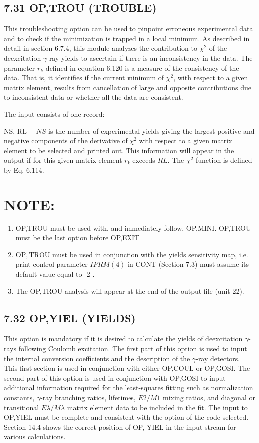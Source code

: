 \documentclass[10pt]{article}
\begin{document}
\subsection*{7.31 OP,TROU (TROUBLE)}
This troubleshooting option can be used to pinpoint erroneous experimental data and to check if the minimization is trapped in a local minimum. As described in detail in section 6.7.4, this module analyzes the contribution to $\chi^{2}$ of the deexcitation $\gamma$-ray yields to ascertain if there is an inconsistency in the data. The parameter $r_{k}$ defined in equation 6.120 is a measure of the consistency of the data. That is, it identifies if the current minimum of $\chi^{2}$, with respect to a given matrix element, results from cancellation of large and opposite contributions due to inconsistent data or whether all the data are consistent.

The input consists of one record:

NS, RL $\quad N S$ is the number of experimental yields giving the largest positive and negative components of the derivative of $\chi^{2}$ with respect to a given matrix element to be selected and printed out. This information will appear in the output if for this given matrix element $r_{k}$ exceeds $R L$. The $\chi^{2}$ function is defined by Eq. 6.114.

\section*{NOTE:}
\begin{enumerate}
  \item OP,TROU must be used with, and immediately follow, OP,MINI. OP,TROU must be the last option before OP,EXIT
  \item $\mathrm{OP}, \mathrm{TROU}$ must be used in conjunction with the yields sensitivity map, i.e. print control parameter $I P R M(4)$ in CONT (Section 7.3) must assume its default value equal to -2 .
  \item The OP,TROU analysis will appear at the end of the output file (unit 22).
\end{enumerate}

\subsection*{7.32 OP,YIEL (YIELDS)}
This option is mandatory if it is desired to calculate the yields of deexcitation $\gamma$-rays following Coulomb excitation. The first part of this option is used to input the internal conversion coefficients and the description of the $\gamma$-ray detectors. This first section is used in conjunction with either OP,COUL or OP,GOSI. The second part of this option is used in conjunction with OP,GOSI to input additional information required for the least-squares fitting such as normalization constants, $\gamma$-ray branching ratios, lifetimes, $E 2 / M 1$ mixing ratios, and diagonal or transitional $E \lambda / M \lambda$ matrix element data to be included in the fit. The input to OP,YIEL must be complete and consistent with the option of the code selected. Section 14.4 shows the correct position of OP, YIEL in the input stream for various calculations.
\end{document}
